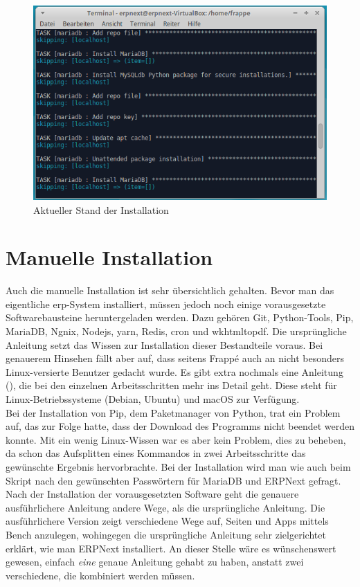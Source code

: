 \begin{figure}[H]
  \centering
  \includegraphics[width=\textwidth]{Bilder/Aktueller_Stand_Installation.PNG}
  \caption{Aktueller Stand der Installation}
  \label{fig:aktInst}
\end{figure}

\section{Manuelle Installation}
Auch die manuelle Installation ist sehr übersichtlich gehalten. Bevor man das eigentliche \gls{erp}-System installiert, müssen jedoch noch einige vorausgesetzte Softwarebausteine heruntergeladen werden. Dazu gehören Git, Python-Tools, Pip, MariaDB, Ngnix, Nodejs, yarn, Redis, cron und wkhtmltopdf. Die ursprüngliche Anleitung setzt das Wissen zur Installation dieser Bestandteile voraus. Bei genauerem Hinsehen fällt aber auf, dass seitens Frappé auch an nicht besonders Linux-versierte Benutzer gedacht wurde. Es gibt extra nochmals eine Anleitung (\vgl \cite{GhGuide}), die bei den einzelnen Arbeitsschritten mehr ins Detail geht. Diese steht für Linux-Betriebssysteme (Debian, Ubuntu) und macOS zur Verfügung. \\
Bei der Installation von Pip, dem Paketmanager von Python, trat ein Problem auf, das zur Folge hatte, dass der Download des Programms nicht beendet werden konnte. Mit ein wenig Linux-Wissen war es aber kein Problem, dies zu beheben, da schon das Aufsplitten eines Kommandos in zwei Arbeitsschritte das gewünschte Ergebnis hervorbrachte. Bei der Installation wird man wie auch beim Skript nach den gewünschten Passwörtern für MariaDB und ERPNext gefragt.
Nach der Installation der vorausgesetzten Software geht die genauere ausführlichere Anleitung andere Wege, als die ursprüngliche Anleitung.
Die ausführlichere Version zeigt verschiedene Wege auf, Seiten und Apps mittels Bench anzulegen, wohingegen die ursprüngliche Anleitung sehr zielgerichtet erklärt, wie man ERPNext installiert. An dieser Stelle wäre es wünschenswert gewesen, einfach \emph{eine} genaue Anleitung gehabt zu haben, anstatt zwei verschiedene, die kombiniert werden müssen.

